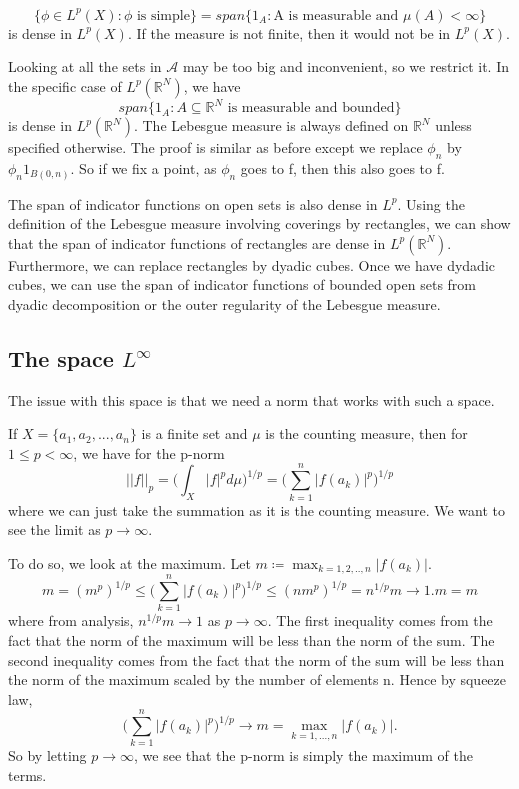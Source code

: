 \documentclass[twoside]{article}
\begin{document}
$$
\{\phi \in L^p(X): \phi \text{ is simple}\} = span\{1_A: \text{A is measurable and } \mu(A) < \infty\}
$$
is dense in $L^p(X)$. If the measure is not finite, then it would not be in $L^p(X)$. 


Looking at all the sets in $\mathcal{A}$ may be too big and inconvenient, so we restrict it. In the specific case of $L^p(\mathbb{R}^N)$, we have
$$
span\{1_A: A\subseteq \mathbb{R}^N \text{ is measurable and bounded}\}
$$
is dense in $L^p(\mathbb{R}^N)$. The Lebesgue measure is always defined on $\mathbb{R}^N$ unless specified otherwise. The proof is similar as before except we replace $\phi_n$ by $\phi_n1_{B(0,n)}$. So if we fix a point, as $\phi_n$ goes to f, then this also goes to f.

The span of indicator functions on open sets is also dense in $L^p$. Using the definition of the Lebesgue measure involving coverings by rectangles, we can show that the span of indicator functions of rectangles are dense in $L^p(\mathbb{R}^N)$. Furthermore, we can replace rectangles by dyadic cubes. Once we have dydadic cubes, we can use the span of indicator functions of bounded open sets from dyadic decomposition or the outer regularity of the Lebesgue measure.

\subsection{The space $L^{\infty}$}

The issue with this space is that we need a norm that works with such a space.

If $X = \{a_1,a_2,...,a_n\}$ is a finite set and $\mu$ is the counting measure, then for $1 \leq p < \infty$, we have for the p-norm
$$
||f||_p = \big(\int_X|f|^pd\mu\big)^{1/p} = \big(\sum_{k=1}^n|f(a_k)|^p\big)^{1/p}
$$
where we can just take the summation as it is the counting measure. We want to see the limit as $p \rightarrow \infty$.

To do so, we look at the maximum. Let $m \coloneqq \max_{k=1,2,..,n}|f(a_k)|$. 
$$
m = (m^p)^{1/p} \leq \big(\sum_{k=1}^n|f(a_k)|^p\big)^{1/p} \leq (nm^p)^{1/p} = n^{1/p}m \rightarrow 1.m = m
$$
where from analysis, $n^{1/p}m \rightarrow 1$ as $p \rightarrow \infty$. The first inequality comes from the fact that the norm of the maximum will be less than the norm of the sum. The second inequality comes from the fact that the norm of the sum will be less than the norm of the maximum scaled by the number of elements n. Hence by squeeze law, $$\big(\sum_{k=1}^n|f(a_k)|^p\big)^{1/p} \rightarrow m = \max_{k=1,...,n}|f(a_k)|.$$ So by letting $p \rightarrow \infty$, we see that the p-norm is simply the maximum of the terms. 
\end{document}
